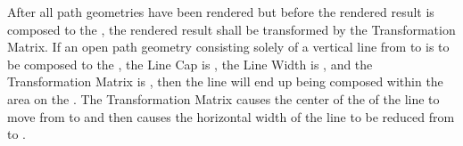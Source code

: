 \pnum
After all path geometries have been rendered but before the rendered result is composed to the \underlyingsurface, the rendered result shall be transformed by the Transformation Matrix.
\enterexample
If an open path geometry consisting solely of a vertical line from  to  is to be composed to the \underlyingsurface, the Line Cap is , the Line Width is , and the Transformation Matrix is , then the line will end up being composed within the area  on the \underlyingsurface. The Transformation Matrix causes the center of the \xaxis of the line to move from  to  and then causes the horizontal width of the line to be reduced from  to .
\exitexample

